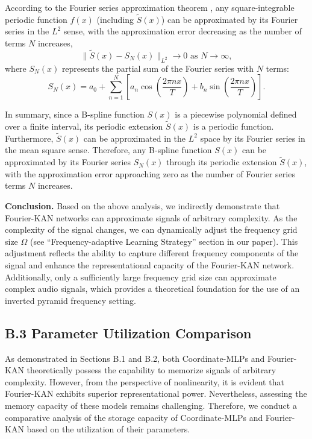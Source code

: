 \documentclass[letterpaper]{article} %
\begin{document}
According to the Fourier series approximation theorem \cite{Davidson2010}, any square-integrable periodic function \( f(x) \) (including \( \tilde{S}(x) \)) can be approximated by its Fourier series in the \( L^2 \) sense, with the approximation error decreasing as the number of terms \( N \) increases,
\[
\| \tilde{S}(x) - S_N(x) \|_{L^2} \to 0 \text{ as } N \to \infty,
\]
where \( S_N(x) \) represents the partial sum of the Fourier series with \( N \) terms:
\[
S_N(x) = a_0 + \sum_{n=1}^{N} \left[ a_n \cos\left(\frac{2\pi n x}{T}\right) + b_n \sin\left(\frac{2\pi n x}{T}\right) \right].
\]

In summary, since a B-spline function \( S(x) \) is a piecewise polynomial defined over a finite interval, its periodic extension \( \tilde{S}(x) \) is a periodic function. Furthermore, \( \tilde{S}(x) \) can be approximated in the \( L^2 \) space by its Fourier series in the mean square sense. Therefore, any B-spline function \( S(x) \) can be approximated by its Fourier series \( S_N(x) \) through its periodic extension \( \tilde{S}(x) \), with the approximation error approaching zero as the number of Fourier series terms \( N \) increases.

\textbf{Conclusion.}
Based on the above analysis, we indirectly demonstrate that Fourier-KAN networks can approximate signals of arbitrary complexity. As the complexity of the signal changes, we can dynamically adjust the frequency grid size \(\Omega\) (see ``Frequency-adaptive Learning Strategy'' section in our paper). This adjustment reflects the ability to capture different frequency components of the signal and enhance the representational capacity of the Fourier-KAN network. Additionally, only a sufficiently large frequency grid size can approximate complex audio signals, which provides a theoretical foundation for the use of an inverted pyramid frequency setting.


\subsection{B.3 Parameter Utilization Comparison}
As demonstrated in Sections B.1 and B.2, both Coordinate-MLPs and Fourier-KAN theoretically possess the capability to memorize signals of arbitrary complexity. However, from the perspective of nonlinearity, it is evident that Fourier-KAN exhibits superior representational power. Nevertheless, assessing the memory capacity of these models remains challenging. Therefore, we conduct a comparative analysis of the storage capacity of Coordinate-MLPs and Fourier-KAN based on the utilization of their parameters.
\end{document}
